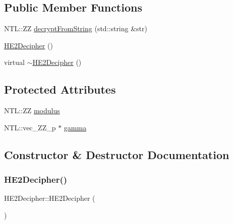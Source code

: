 \subsection*{Public Member Functions}
\begin{DoxyCompactItemize}
\item 
N\+T\+L\+::\+ZZ \hyperlink{classHE2Decipher_ac2b41a7a93daf683ab998f77cd59519c}{decrypt\+From\+String} (std\+::string \&str)
\item 
\hyperlink{classHE2Decipher_a80958b0ebcd436c8b580cb91a087bb38}{H\+E2\+Decipher} ()
\item 
virtual \hyperlink{classHE2Decipher_a6f9d97ecc078e22b051fbf59b12fff89}{$\sim$\+H\+E2\+Decipher} ()
\end{DoxyCompactItemize}
\subsection*{Protected Attributes}
\begin{DoxyCompactItemize}
\item 
N\+T\+L\+::\+ZZ \hyperlink{classHE2Decipher_ae77640302cf735f4b9b3a74d9da87563}{modulus}
\item 
N\+T\+L\+::vec\+\_\+\+Z\+Z\+\_\+p $\ast$ \hyperlink{classHE2Decipher_a08f53cc4849910945d4ba7f4f16e93a2}{gamma}
\end{DoxyCompactItemize}


\subsection{Constructor \& Destructor Documentation}
\mbox{\label{classHE2Decipher_a80958b0ebcd436c8b580cb91a087bb38}} 
\subsubsection{\texorpdfstring{H\+E2\+Decipher()}{HE2Decipher()}}
{\footnotesize\ttfamily H\+E2\+Decipher\+::\+H\+E2\+Decipher (\begin{DoxyParamCaption}{ }\end{DoxyParamCaption})}

\mbox{\label{classHE2Decipher_a6f9d97ecc078e22b051fbf59b12fff89}} 
